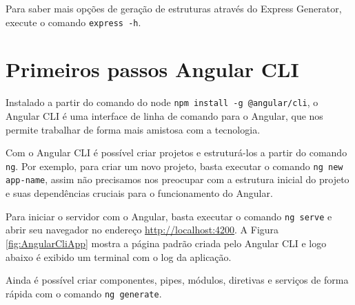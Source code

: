 \documentclass[
	12pt,				%
	openright,			%
	twoside,			%
	a4paper,			%
	english,			%
	brazil				%
	]{abntex2}
\begin{document}
\begin{anexosenv}
Para saber mais opções de geração de estruturas através do Express Generator, execute o comando \verb|express -h|.

\chapter{Primeiros passos Angular CLI} 

Instalado a partir do comando do node \verb|npm install -g @angular/cli|, o Angular CLI é uma interface de linha de comando para o Angular, que nos permite trabalhar de forma mais amistosa com a tecnologia.

Com o Angular CLI é possível criar projetos e estruturá-los a partir do comando \verb|ng|. Por exemplo, para criar um novo projeto, basta executar o comando \verb|ng new app-name|, assim não precisamos nos preocupar com a estrutura inicial do projeto e suas dependências cruciais para o funcionamento do Angular. 

Para iniciar o servidor com o Angular, basta executar o comando \verb|ng serve| e abrir seu navegador no endereço \href{http://localhost:4200}{http://localhost:4200}. A Figura \ref{fig:AngularCliApp} mostra a página padrão criada pelo Angular CLI e logo abaixo é exibido um terminal com o log da aplicação.

Ainda é possível criar componentes, pipes, módulos, diretivas e serviços de forma rápida com o comando \verb|ng generate|.

\begin{figure}[h]
	\centering


\end{figure}
\end{anexosenv}
\end{document}
